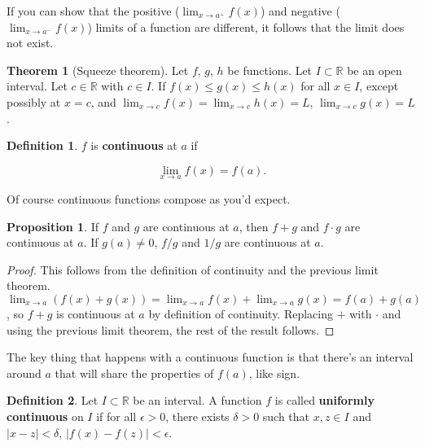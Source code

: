 \documentclass{article}
\theoremstyle{definition}
\newtheorem{definition}{Definition}[section]
\newtheorem{proposition}{Proposition}[section]
\newtheorem{theorem}{Theorem}[section]
\begin{document}
If you can show that the positive ($\lim_{x \to a^{+}} f(x)$) and negative
($\lim_{x \to a^{-}} f(x) $) limits of a function are
different, it follows that the limit does not exist.

\begin{theorem}[Squeeze theorem]
Let $f$, $g$, $h$ be functions. Let $I \subset \mathbb{R}$ be an open interval. Let $c \in \mathbb{R}$ with $c \in I$. If $f(x) \leq g(x) \leq h(x)$ for all $x \in I$, except possibly at $x = c$, and $\lim_{x \to c} f(x) = \lim_{x \to c} h(x) = L$, $\lim_{x \to c} g(x) = L$.
\end{theorem}

\begin{definition}

$f$ is \textbf{continuous} at $a$ if

\begin{equation*}
\lim_{x \to a} f(x) = f(a).
\end{equation*}

\end{definition}

Of course continuous functions compose as you'd expect.

\begin{proposition}

If $f$ and $g$ are continuous at $a$, then $f+g$ and $f \cdot g$ are continuous
at $a$. If $g(a) \neq 0$, $f/g$ and $1/g$ are continuous at $a$.

\end{proposition}

\begin{proof}

This follows from the definition of continuity and the previous limit
theorem. $\lim_{x \to a} (f(x) + g(x)) = \lim_{x \to a} f(x) + \lim_{x \to a}
g(x) = f(a) + g(a)$, so $f + g$ is continuous at $a$ by definition of
continuity. Replacing $+$ with $\cdot$ and using the previous limit theorem, the
rest of the result follows.

\end{proof}

The key thing that happens with a continuous function is that there's an
interval around $a$ that will share the properties of $f(a)$, like sign.

\begin{definition}
Let $I \subset \mathbb{R}$ be an interval. A function $f$ is called \textbf{uniformly continuous} on $I$ if for all $\epsilon > 0$, there exists $\delta > 0$ such that $x, z \in I$ and $|x - z| < \delta$, $|f(x) - f(z)| < \epsilon$.
\end{definition}
\end{document}
